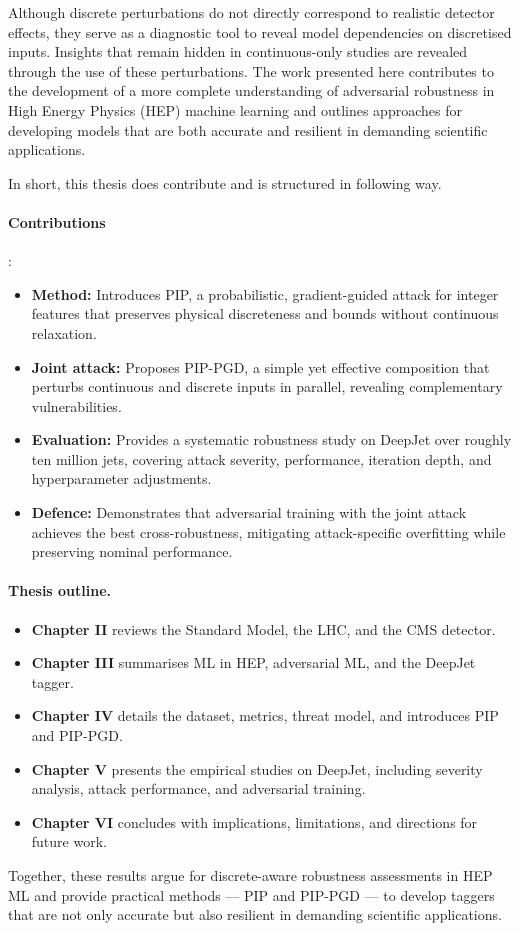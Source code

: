 Although discrete perturbations do not directly correspond to realistic detector effects, they serve as a diagnostic tool to reveal model dependencies on discretised inputs. Insights that remain hidden in continuous-only studies are revealed through the use of these perturbations. The work presented here contributes to the development of a more complete understanding of adversarial robustness in High Energy Physics (HEP) machine learning and outlines approaches for developing models that are both accurate and resilient in demanding scientific applications.

\newpage
In short, this thesis does contribute and is structured in following way. 

\paragraph{Contributions}:
\begin{itemize}
    \item \textbf{Method:} Introduces PIP, a probabilistic, gradient-guided attack for integer features that preserves physical discreteness and bounds without continuous relaxation.
    \item \textbf{Joint attack:} Proposes PIP-PGD, a simple yet effective composition that perturbs continuous and discrete inputs in parallel, revealing complementary vulnerabilities.
    \item \textbf{Evaluation:} Provides a systematic robustness study on DeepJet over roughly ten million jets, covering attack severity, performance, iteration depth, and hyperparameter adjustments.
    \item \textbf{Defence:} Demonstrates that adversarial training with the joint attack achieves the best cross-robustness, mitigating attack-specific overfitting while preserving nominal performance.
\end{itemize}

\paragraph{Thesis outline.}
\begin{itemize}
    \item \textbf{Chapter II} reviews the Standard Model, the LHC, and the CMS detector.
    \item \textbf{Chapter III} summarises ML in HEP, adversarial ML, and the DeepJet tagger.
    \item \textbf{Chapter IV} details the dataset, metrics, threat model, and introduces PIP and PIP-PGD.
    \item \textbf{Chapter V} presents the empirical studies on DeepJet, including severity analysis, attack performance, and adversarial training.
    \item \textbf{Chapter VI} concludes with implications, limitations, and directions for future work.
\end{itemize}

Together, these results argue for discrete-aware robustness assessments in HEP ML and provide practical methods — PIP and PIP-PGD — to develop taggers that are not only accurate but also resilient in demanding scientific applications.
